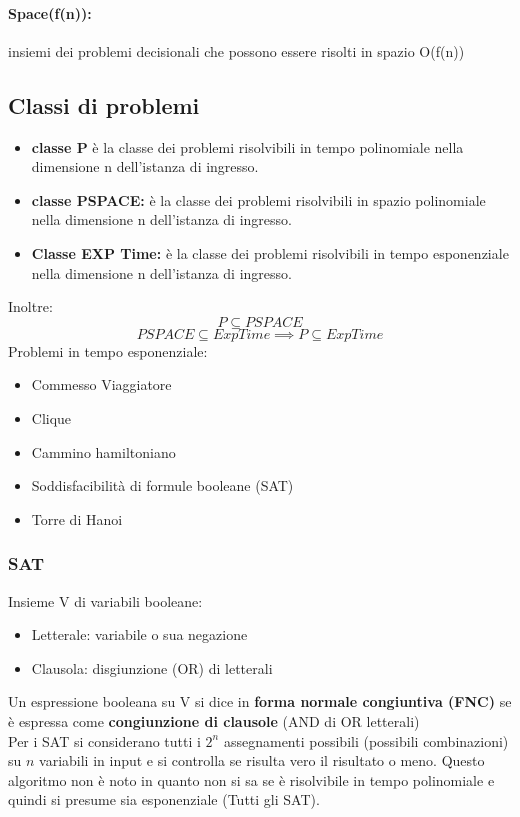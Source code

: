 \documentclass[a4paper,12pt]{article}
\begin{document}
\paragraph{Space(f(n)):} insiemi dei problemi decisionali che possono essere risolti in spazio O(f(n))
\subsection{Classi di problemi}
\begin{itemize}
    \item \textbf{classe P} è la classe dei problemi risolvibili in tempo polinomiale nella dimensione n dell'istanza di ingresso.
    \item \textbf{classe PSPACE:} è la classe dei problemi risolvibili in spazio polinomiale nella dimensione n dell'istanza di ingresso.
    \item \textbf{Classe EXP Time:} è la classe dei problemi risolvibili in tempo esponenziale nella dimensione n dell'istanza di ingresso.
\end{itemize}
Inoltre:
\[
P \subseteq PSPACE
\]
\[
PSPACE \subseteq ExpTime \implies P \subseteq ExpTime
\]
Problemi in tempo esponenziale:
\begin{itemize}
    \item Commesso Viaggiatore
    \item Clique
    \item Cammino hamiltoniano
    \item Soddisfacibilità di formule booleane (SAT)
    \item Torre di Hanoi
\end{itemize}
\subsubsection{SAT}
Insieme V di variabili booleane:
\begin{itemize}
    \item Letterale: variabile o sua negazione
    \item Clausola: disgiunzione (OR) di letterali
\end{itemize}
Un espressione booleana su V si dice in \textbf{forma normale congiuntiva (FNC)} se è espressa come \textbf{congiunzione di clausole} (AND di OR letterali)\\
Per i SAT si considerano tutti i $2^n$ assegnamenti possibili (possibili combinazioni) su $n$ variabili in input e si controlla se risulta vero il risultato o meno. Questo algoritmo non è noto in quanto non si sa se è risolvibile in tempo polinomiale e quindi si presume sia esponenziale (Tutti gli SAT).
\end{document}
